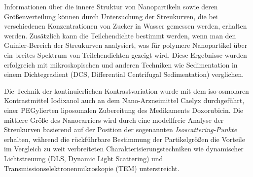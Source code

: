 


Informationen über die innere Struktur von Nanopartikeln sowie deren Größenverteilung können durch Untersuchung der Streukurven, die bei verschiedenen Konzentrationen von Zucker in Wasser gemessen werden, erhalten werden. Zusätzlich kann die Teilchendichte bestimmt werden, wenn man den Guinier-Bereich der Streukurven analysiert, was für polymere Nanopartikel über ein breites Spektrum von Teilchendichten gezeigt wird. Diese Ergebnisse wurden erfolgreich mit mikroskopischen und anderen Techniken wie Sedimentation in einem Dichtegradient (DCS, Differential Centrifugal Sedimentation) verglichen.

Die Technik der kontinuierlichen Kontrastvariation wurde mit dem iso-osmolaren Kontrastmittel Iodixanol auch an dem Nano-Arzneimittel Caelyx durchgeführt, einer PEGylierten liposomalen Zubereitung des Medikaments Doxorubicin. Die mittlere Größe des Nanocarriers wird durch eine modellfreie Analyse der Streukurven basierend auf der Position der sogenannten \emph{Isoscattering-Punkte} erhalten, während die rückführbare Bestimmung der Partikelgrößen die Vorteile im Vergleich zu weit verbreiteten Charakterisierungstechniken wie dynamischer Lichtstreuung (DLS, Dynamic Light Scattering) und Transmissionselektronenmikroskopie (TEM) unterstreicht.



